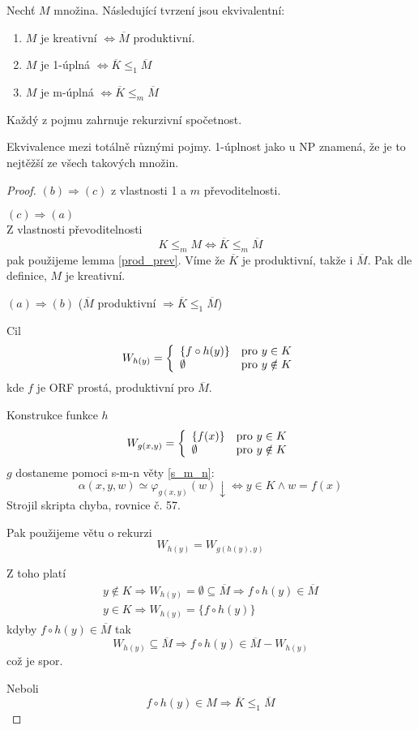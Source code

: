 \begin{theorem}
	Nechť $M$ množina.
	Následující tvrzení jsou ekvivalentní:
	\begin{enumerate}[label=(\alph*)]
	    	\item $M$ je kreativní $\iff \overline{M}$ produktivní.
		\item $M$ je 1-úplná $\iff \overline{K} \leq_1 \overline{M}$
		\item $M$ je m-úplná $\iff \overline{K} \leq_m \overline{M}$
	\end{enumerate}
	Každý z pojmu zahrnuje rekurzivní spočetnost.

	Ekvivalence mezi totálně různými pojmy. 1-úplnost jako u NP znamená, že je to nejtěžší ze všech takových množin.
\end{theorem}
\begin{proof}
	$(b) \Rightarrow (c)$ z vlastnosti 1 a $m$ převoditelnosti.

	$(c) \Rightarrow (a)$ \\
	Z vlastnosti převoditelnosti
	\[ K \leq_m M \iff \overline{K} \leq_m \overline{M} \]
	pak použijeme lemma \cref{prod_prev}.
	Víme že $\overline{K}$ je produktivní, takže i $\overline{M}$.
	Pak dle definice, $M$ je kreativní.

	$(a) \Rightarrow (b)$ ($\overline{M}$ produktivní $\Rightarrow \overline{K} \leq_1 \overline{M}$)

	Cil
	\[ W_{h(y)} = \left\{ \begin{array}{ll}  \{ f \circ h(y) \}  & \mbox{pro }  y \in K  \\  \emptyset  & \mbox{pro }  y \notin K  \end{array} \right. \]
	kde $f$ je ORF prostá, produktivní pro $\overline{M}$.

	Konstrukce funkce $h$
	\[ W_{g(x, y)} = \left\{ \begin{array}{ll}  \{ f(x) \}  & \mbox{pro }  y \in K  \\  \emptyset  & \mbox{pro }  y \notin K  \end{array} \right. \]
	$g$ dostaneme pomoci s-m-n věty \cref{s_m_n}:
	\[ \alpha(x, y, w) \simeq \varphi_{g(x, y)} (w) \downarrow \iff y \in K \land w = f(x) \]
	Strojil skripta chyba, rovnice č. 57.

	Pak použijeme větu o rekurzi
	\[ W_{h(y)} = W_{g(h(y), y)} \]

	Z toho platí
	\begin{gather*}
		y \notin K \Rightarrow W_{h(y)} = \emptyset \subseteq \overline{M} \Rightarrow f \circ h(y) \in \overline{M} \\
		y \in K \Rightarrow W_{h(y)} = \{ f \circ h(y) \}
	\end{gather*}
	kdyby $f \circ h(y) \in \overline{M}$ tak
	\[ W_{h(y)} \subseteq \overline{M} \Rightarrow f \circ h(y) \in \overline{M} - W_{h(y)} \]
	což je spor.

	Neboli
	\[ f \circ h(y) \in M \Rightarrow \overline{K} \leq_1 \overline{M} \]
\end{proof}

